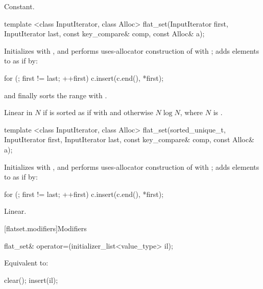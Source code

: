 \begin{codeblock}
\begin{codeblock}
\begin{codeblock}
\begin{addedblock}
\begin{itemdescr}
\pnum
\complexity
Constant.
\end{itemdescr}

%
\begin{itemdecl}
template <class InputIterator, class Alloc>
  flat_set(InputIterator first, InputIterator last,
           const key_compare& comp, const Alloc& a);
\end{itemdecl}

\begin{itemdescr}
\pnum
\effects Initializes  with , and performs
uses-allocator construction of 
with ; adds elements to  as if by:
\begin{codeblock}
for (; first != last; ++first) {
  c.insert(c.end(), *first);
}
\end{codeblock}
and finally sorts the range  with .

\pnum
\complexity
Linear in $N$ if  is sorted as if with  and
otherwise $N \log N$, where $N$ is .
\end{itemdescr}

%
\begin{itemdecl}
template <class InputIterator, class Alloc>
  flat_set(sorted_unique_t, InputIterator first, InputIterator last,
           const key_compare& comp, const Alloc& a);
\end{itemdecl}

\begin{itemdescr}
\pnum
\effects Initializes  with , and performs
uses-allocator construction of 
with ; adds elements to  as if by:
\begin{codeblock}
for (; first != last; ++first) {
  c.insert(c.end(), *first);
}
\end{codeblock}

\pnum
\complexity
Linear.
\end{itemdescr}

[flatset.modifiers]{Modifiers}

%
\begin{itemdecl}
flat_set& operator=(initializer_list<value_type> il);
\end{itemdecl}

\begin{itemdescr}
\pnum
\effects Equivalent to:
\begin{codeblock}
clear();
insert(il);
\end{codeblock}
\end{itemdescr}


\end{addedblock}
\end{codeblock}
\end{codeblock}
\end{codeblock}
